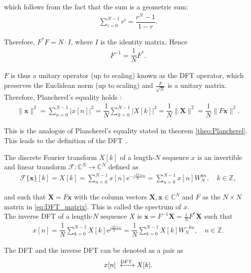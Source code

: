 which follows from the fact that the sum is a geometric sum:
\begin{align*}
\sum_{i=0}^{N-1} r^i = \dfrac{r^N-1}{1-r}.
\end{align*}

Therefore, $F^*F = N \cdot I$, where $I$ is the identity matrix. Hence
\begin{align*}
F^{-1} = \dfrac{1}{N} F^*.
\end{align*}

$F$ is thus a unitary operator (up to scaling) known as the DFT operator, which preserves the Euclidean norm (up to scaling) and $\frac{F}{\sqrt{N}}$ is a unitary matrix. Therefore, Plancherel's equality holds \cite{page 258, FSP}:
\begin{align*}
\|\textbf{x}\|^2 = \sum_{n=0}^{N-1} |x[n]|^2 = \dfrac{1}{N} \sum_{k=0}^{N-1} |X[k]|^2 = \dfrac{1}{N} \|\textbf{X}\|^2 = \dfrac{1}{N} \|F\textbf{x}\|^2.
\end{align*}

This is the analogue of Plancherel's equality stated in theorem \ref{theo:Plancherel}. This leads to the definition of the DFT \cite{page 253, FSP}.

\begin{definition} \label{def:DFT}
The discrete Fourier transform $X[k]$ of a length-$N$ sequence $x$ is an invertible and linear transform $\mathcal{F}: \mathbb{C}^N \to \mathbb{C}^N$ defined as
\begin{align} \label{eq:def_DFT}
\mathcal{F}\{\textbf{x}\}[k] = X[k] = \sum_{n=0}^{N-1} x[n] \text{e}^{-j\frac{2 \pi}{N}kn} = \sum_{n=0}^{N-1} x[n] W_N^{kn}, \quad k \in \mathbb{Z},
\end{align}

and such that $\textbf{X} = F\textbf{x}$ with the column vectors $\textbf{X}, \textbf{x} \in \mathbb{C}^N$ and $F$ as the $N\times N$ matrix in \eqref{eq:DFT_matrix}. This is called the spectrum of $x$. \\
The inverse DFT of a length-$N$ sequence $X$ is $\textbf{x} = F^{-1} \textbf{X} = \frac{1}{N} F^* \textbf{X}$ such that
\begin{align*}
x[n] = \dfrac{1}{N}\sum_{k=0}^{N-1} X[k] \text{e}^{j\frac{2 \pi}{N}kn} = \dfrac{1}{N}\sum_{k=0}^{N-1} X[k] W_N^{-kn}, \quad n \in \mathbb{Z}.
\end{align*}

The DFT and the inverse DFT can be denoted as a pair as
\begin{align*}
x[n] \xleftrightarrow{\text{DFT}} X[k].
\end{align*}
\end{definition}

